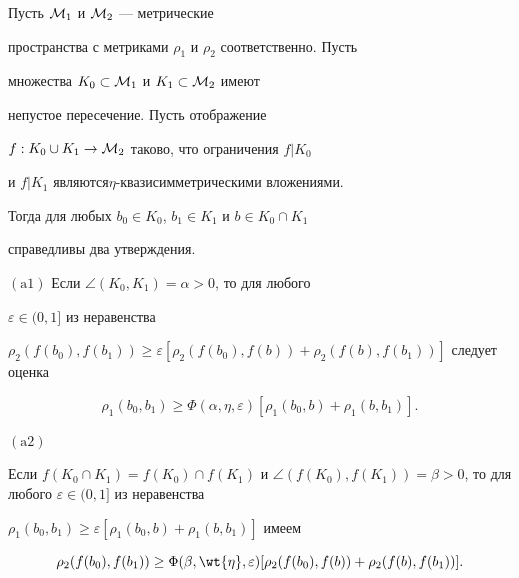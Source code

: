 \begin{lems}


Пусть ${\cal M}_1$ и ${\cal M}_2$ --- метрические 


пространства с метриками $\rho_1$ и $\rho_2$ соответственно. Пусть 


множества $K_0 \subset {\cal M}_1$ и $K_1 \subset {\cal M}_2$ имеют 


непустое пересечение. Пусть отображение 


$f: K_0 \cup K_1 \to {\cal M}_2$ таково, что ограничения $f|K_0$ 


и $f|K_1$ являются\linebreak $\eta$-{}квазисимметрическими вложениями.


Тогда для любых $b_0\in K_0$, $b_1 \in K_1$ и $b\in K_0\cap K_1$


справедливы два утверждения.





$(\mathrm a1)$ Если $\angle (K_0, K_1)=\alpha > 0$, то для любого 


$\varepsilon \in (0,1]$ из неравенства 


$ \rho_2(f(b_0), f(b_1)) \geq \varepsilon [\rho_2(f(b_0), f(b))+


\rho_2(f(b), f(b_1))]$ следует оценка


\begin{equation}


\rho_1(b_0, b_1) \geq \Phi(\alpha, \eta, \varepsilon)[\rho_1(b_0, b)+


\rho_1(b, b_1)].


\end{equation}





$(\mathrm a2)$


Если $f(K_0 \cap K_1)=f(K_0)\cap f(K_1)$ и $\angle(f(K_0), f(K_1))=


\beta > 0$, то для любого $\varepsilon \in (0,1]$ из неравенства 


$\rho_1(b_0, b_1) \geq \varepsilon [\rho_1(b_0, b)+\rho_1(b, b_1)] $ имеем


\begin{equation} 


\rho_2(f(b_0), f(b_1)) \geq \Phi(\beta, \wt{\eta}, \varepsilon) [\rho_2( 


f(b_0), f(b))+\rho_2(f(b), f(b_1))].


\end{equation}


\end{lems}








